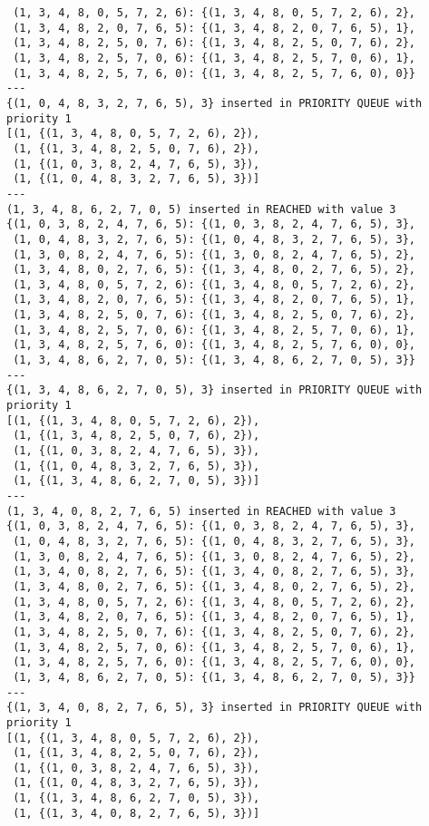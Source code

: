 \documentclass{article}
\begin{document}
\begin{verbatim}
 (1, 3, 4, 8, 0, 5, 7, 2, 6): {(1, 3, 4, 8, 0, 5, 7, 2, 6), 2},
 (1, 3, 4, 8, 2, 0, 7, 6, 5): {(1, 3, 4, 8, 2, 0, 7, 6, 5), 1},
 (1, 3, 4, 8, 2, 5, 0, 7, 6): {(1, 3, 4, 8, 2, 5, 0, 7, 6), 2},
 (1, 3, 4, 8, 2, 5, 7, 0, 6): {(1, 3, 4, 8, 2, 5, 7, 0, 6), 1},
 (1, 3, 4, 8, 2, 5, 7, 6, 0): {(1, 3, 4, 8, 2, 5, 7, 6, 0), 0}}
---
{(1, 0, 4, 8, 3, 2, 7, 6, 5), 3} inserted in PRIORITY QUEUE with priority 1
[(1, {(1, 3, 4, 8, 0, 5, 7, 2, 6), 2}),
 (1, {(1, 3, 4, 8, 2, 5, 0, 7, 6), 2}),
 (1, {(1, 0, 3, 8, 2, 4, 7, 6, 5), 3}),
 (1, {(1, 0, 4, 8, 3, 2, 7, 6, 5), 3})]
---
(1, 3, 4, 8, 6, 2, 7, 0, 5) inserted in REACHED with value 3
{(1, 0, 3, 8, 2, 4, 7, 6, 5): {(1, 0, 3, 8, 2, 4, 7, 6, 5), 3},
 (1, 0, 4, 8, 3, 2, 7, 6, 5): {(1, 0, 4, 8, 3, 2, 7, 6, 5), 3},
 (1, 3, 0, 8, 2, 4, 7, 6, 5): {(1, 3, 0, 8, 2, 4, 7, 6, 5), 2},
 (1, 3, 4, 8, 0, 2, 7, 6, 5): {(1, 3, 4, 8, 0, 2, 7, 6, 5), 2},
 (1, 3, 4, 8, 0, 5, 7, 2, 6): {(1, 3, 4, 8, 0, 5, 7, 2, 6), 2},
 (1, 3, 4, 8, 2, 0, 7, 6, 5): {(1, 3, 4, 8, 2, 0, 7, 6, 5), 1},
 (1, 3, 4, 8, 2, 5, 0, 7, 6): {(1, 3, 4, 8, 2, 5, 0, 7, 6), 2},
 (1, 3, 4, 8, 2, 5, 7, 0, 6): {(1, 3, 4, 8, 2, 5, 7, 0, 6), 1},
 (1, 3, 4, 8, 2, 5, 7, 6, 0): {(1, 3, 4, 8, 2, 5, 7, 6, 0), 0},
 (1, 3, 4, 8, 6, 2, 7, 0, 5): {(1, 3, 4, 8, 6, 2, 7, 0, 5), 3}}
---
{(1, 3, 4, 8, 6, 2, 7, 0, 5), 3} inserted in PRIORITY QUEUE with priority 1
[(1, {(1, 3, 4, 8, 0, 5, 7, 2, 6), 2}),
 (1, {(1, 3, 4, 8, 2, 5, 0, 7, 6), 2}),
 (1, {(1, 0, 3, 8, 2, 4, 7, 6, 5), 3}),
 (1, {(1, 0, 4, 8, 3, 2, 7, 6, 5), 3}),
 (1, {(1, 3, 4, 8, 6, 2, 7, 0, 5), 3})]
---
(1, 3, 4, 0, 8, 2, 7, 6, 5) inserted in REACHED with value 3
{(1, 0, 3, 8, 2, 4, 7, 6, 5): {(1, 0, 3, 8, 2, 4, 7, 6, 5), 3},
 (1, 0, 4, 8, 3, 2, 7, 6, 5): {(1, 0, 4, 8, 3, 2, 7, 6, 5), 3},
 (1, 3, 0, 8, 2, 4, 7, 6, 5): {(1, 3, 0, 8, 2, 4, 7, 6, 5), 2},
 (1, 3, 4, 0, 8, 2, 7, 6, 5): {(1, 3, 4, 0, 8, 2, 7, 6, 5), 3},
 (1, 3, 4, 8, 0, 2, 7, 6, 5): {(1, 3, 4, 8, 0, 2, 7, 6, 5), 2},
 (1, 3, 4, 8, 0, 5, 7, 2, 6): {(1, 3, 4, 8, 0, 5, 7, 2, 6), 2},
 (1, 3, 4, 8, 2, 0, 7, 6, 5): {(1, 3, 4, 8, 2, 0, 7, 6, 5), 1},
 (1, 3, 4, 8, 2, 5, 0, 7, 6): {(1, 3, 4, 8, 2, 5, 0, 7, 6), 2},
 (1, 3, 4, 8, 2, 5, 7, 0, 6): {(1, 3, 4, 8, 2, 5, 7, 0, 6), 1},
 (1, 3, 4, 8, 2, 5, 7, 6, 0): {(1, 3, 4, 8, 2, 5, 7, 6, 0), 0},
 (1, 3, 4, 8, 6, 2, 7, 0, 5): {(1, 3, 4, 8, 6, 2, 7, 0, 5), 3}}
---
{(1, 3, 4, 0, 8, 2, 7, 6, 5), 3} inserted in PRIORITY QUEUE with priority 1
[(1, {(1, 3, 4, 8, 0, 5, 7, 2, 6), 2}),
 (1, {(1, 3, 4, 8, 2, 5, 0, 7, 6), 2}),
 (1, {(1, 0, 3, 8, 2, 4, 7, 6, 5), 3}),
 (1, {(1, 0, 4, 8, 3, 2, 7, 6, 5), 3}),
 (1, {(1, 3, 4, 8, 6, 2, 7, 0, 5), 3}),
 (1, {(1, 3, 4, 0, 8, 2, 7, 6, 5), 3})]

\end{verbatim}
\end{document}
